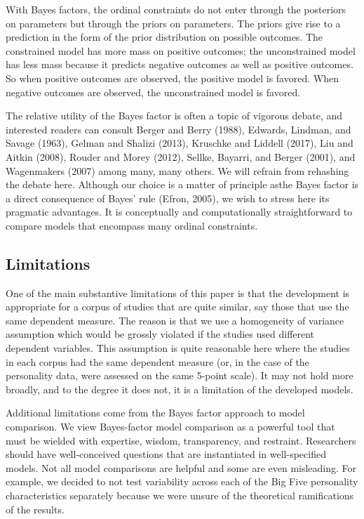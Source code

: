 \documentclass[english,man]{apa6}
\theoremstyle{definition}
\theoremstyle{definition}
\theoremstyle{definition}
\theoremstyle{remark}
\begin{document}
With Bayes factors, the ordinal constraints do not enter through the
posteriors on parameters but through the priors on parameters. The
priors give rise to a prediction in the form of the prior distribution
on possible outcomes. The constrained model has more mass on positive
outcomes; the unconstrained model has less mass because it predicts
negative outcomes as well as positive outcomes. So when positive
outcomes are observed, the positive model is favored. When negative
outcomes are observed, the unconstrained model is favored.

The relative utility of the Bayes factor is often a topic of vigorous
debate, and interested readers can consult Berger and Berry (1988),
Edwards, Lindman, and Savage (1963), Gelman and Shalizi (2013), Kruschke
and Liddell (2017), Liu and Aitkin (2008), Rouder and Morey (2012),
Sellke, Bayarri, and Berger (2001), and Wagenmakers (2007) among many,
many others. We will refrain from rehashing the debate here. Although
our choice is a matter of principle asthe Bayes factor is a direct
consequence of Bayes' rule (Efron, 2005), we wish to stress here its
pragmatic advantages. It is conceptually and computationally
straightforward to compare models that encompass many ordinal
constraints.

\subsection{Limitations}\label{limitations}

One of the main substantive limitations of this paper is that the
development is appropriate for a corpus of studies that are quite
similar, say those that use the same dependent measure. The reason is
that we use a homogeneity of variance assumption which would be grossly
violated if the studies used different dependent variables. This
assumption is quite reasonable here where the studies in each corpus had
the same dependent measure (or, in the case of the personality data,
were assessed on the same 5-point scale). It may not hold more broadly,
and to the degree it does not, it is a limitation of the developed
models.

Additional limitations come from the Bayes factor approach to model
comparison. We view Bayes-factor model comparison as a powerful tool
that must be wielded with expertise, wisdom, transparency, and
restraint. Researchers should have well-conceived questions that are
instantiated in well-specified models. Not all model comparisons are
helpful and some are even misleading. For example, we decided to not
test variability across each of the Big Five personality characteristics
separately because we were unsure of the theoretical ramifications of
the results.
\end{document}

